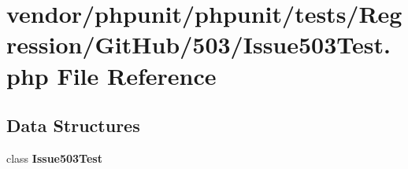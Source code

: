 \section{vendor/phpunit/phpunit/tests/\+Regression/\+Git\+Hub/503/\+Issue503\+Test.php File Reference}
\label{_issue503_test_8php}
\subsection*{Data Structures}
\begin{DoxyCompactItemize}
\item 
class {\bf Issue503\+Test}
\end{DoxyCompactItemize}
